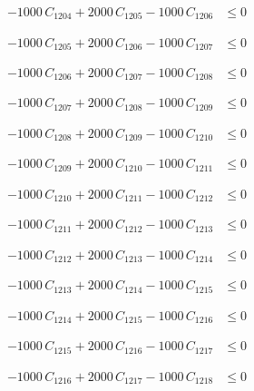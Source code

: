 \documentclass[a4paper,11pt]{article}
\begin{document}
\begin{align}
-1000\,C_{1204} + 2000\,C_{1205} - 1000\,C_{1206} &\leq 0 \nonumber
\end{align}

\begin{align}
-1000\,C_{1205} + 2000\,C_{1206} - 1000\,C_{1207} &\leq 0 \nonumber
\end{align}

\begin{align}
-1000\,C_{1206} + 2000\,C_{1207} - 1000\,C_{1208} &\leq 0 \nonumber
\end{align}

\begin{align}
-1000\,C_{1207} + 2000\,C_{1208} - 1000\,C_{1209} &\leq 0 \nonumber
\end{align}

\begin{align}
-1000\,C_{1208} + 2000\,C_{1209} - 1000\,C_{1210} &\leq 0 \nonumber
\end{align}

\begin{align}
-1000\,C_{1209} + 2000\,C_{1210} - 1000\,C_{1211} &\leq 0 \nonumber
\end{align}

\begin{align}
-1000\,C_{1210} + 2000\,C_{1211} - 1000\,C_{1212} &\leq 0 \nonumber
\end{align}

\begin{align}
-1000\,C_{1211} + 2000\,C_{1212} - 1000\,C_{1213} &\leq 0 \nonumber
\end{align}

\begin{align}
-1000\,C_{1212} + 2000\,C_{1213} - 1000\,C_{1214} &\leq 0 \nonumber
\end{align}

\begin{align}
-1000\,C_{1213} + 2000\,C_{1214} - 1000\,C_{1215} &\leq 0 \nonumber
\end{align}

\begin{align}
-1000\,C_{1214} + 2000\,C_{1215} - 1000\,C_{1216} &\leq 0 \nonumber
\end{align}

\begin{align}
-1000\,C_{1215} + 2000\,C_{1216} - 1000\,C_{1217} &\leq 0 \nonumber
\end{align}

\begin{align}
-1000\,C_{1216} + 2000\,C_{1217} - 1000\,C_{1218} &\leq 0 \nonumber
\end{align}
\end{document}
